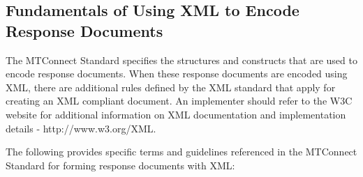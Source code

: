 \documentclass{mtconnect}	%
\begin{document}
\pagebreak

\subsection{Fundamentals of Using XML to Encode Response Documents}
\label{appendix:A}

The MTConnect Standard specifies the structures and constructs that are used to encode \glspl{response document}.  When these \glspl{response document} are encoded using XML, there are additional rules defined by the XML standard that apply for creating an XML compliant document.  An implementer should refer to the W3C website for additional information on XML documentation and implementation details - http://www.w3.org/XML.

The following provides specific terms and guidelines referenced in the MTConnect Standard for forming \glspl{response document} with XML:  
\end{document}
